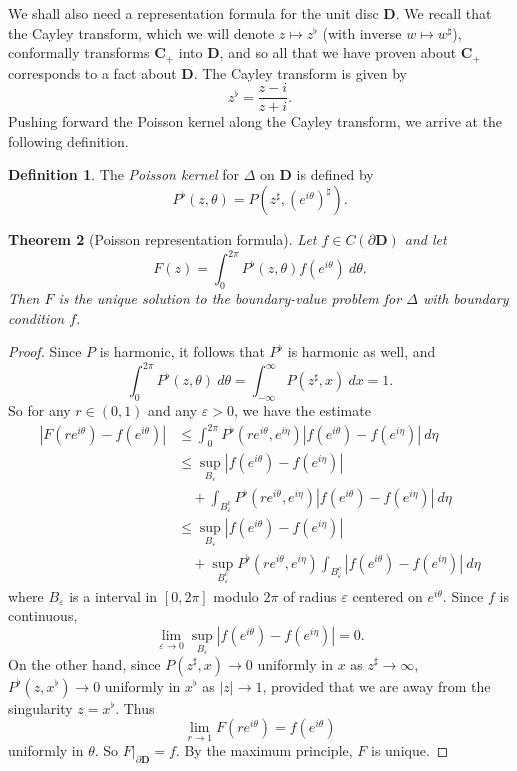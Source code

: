 \documentclass[12pt]{report}
\newcommand{\CC}{\mathbf{C}}
\newcommand{\DD}{\mathbf{D}}
\newcommand{\dfn}[1]{\emph{#1}\index{#1}}
\newtheorem{theorem}{Theorem}[chapter]
\theoremstyle{definition}
\newtheorem{definition}[theorem]{Definition}
\begin{document}
We shall also need a representation formula for the unit disc $\DD$. We recall that the Cayley transform, which we will denote $z \mapsto z^\flat$ (with inverse $w \mapsto w^\sharp$), conformally transforms $\CC_+$ into $\DD$, and so all that we have proven about $\CC_+$ corresponds to a fact about $\DD$. The Cayley transform is given by
$$z^\flat = \frac{z - i}{z + i}.$$
Pushing forward the Poisson kernel along the Cayley transform, we arrive at the following definition.
\begin{definition}
The \dfn{Poisson kernel} for $\Delta$ on $\DD$ is defined by
$$P^\flat(z, \theta) = P(z^\sharp, (e^{i\theta})^\sharp).$$
\end{definition}
\begin{theorem}[Poisson representation formula]
Let $f \in C(\partial \DD)$ and let
$$F(z) = \int_0^{2\pi} P^\flat(z, \theta)f(e^{i\theta}) ~d\theta.$$
Then $F$ is the unique solution to the boundary-value problem for $\Delta$ with boundary condition $f$.
\end{theorem}
\begin{proof}
Since $P$ is harmonic, it follows that $P^\flat$ is harmonic as well, and
$$\int_0^{2\pi} P^\flat(z, \theta) ~d\theta = \int_{-\infty}^\infty P(z^\sharp, x) ~dx = 1.$$
So for any $r \in (0, 1)$ and any $\varepsilon > 0$, we have the estimate
\begin{align*}
  |F(re^{i\theta}) - f(e^{i\theta})| &\leq \int_0^{2\pi} P^\flat(re^{i\theta}, e^{i\eta})|f(e^{i\theta}) - f(e^{i\eta})| ~d\eta\\
    &\leq \sup_{B_\varepsilon} |f(e^{i\theta}) - f(e^{i\eta})| \\
      &\quad+ \int_{B_\varepsilon^c} P^\flat(re^{i\theta}, e^{i\eta})|f(e^{i\theta}) - f(e^{i\eta})| ~d\eta\\
    &\leq \sup_{B_\varepsilon} |f(e^{i\theta}) - f(e^{i\eta})| \\
      &\quad+ \sup_{B_\varepsilon^c} P^\flat(re^{i\theta}, e^{i\eta}) \int_{B_\varepsilon^c} |f(e^{i\theta}) - f(e^{i\eta})| ~d\eta
\end{align*}
where $B_\varepsilon$ is a interval in $[0, 2\pi]$ modulo $2\pi$ of radius $\varepsilon$ centered on $e^{i\theta}$. Since $f$ is continuous,
$$\lim_{\varepsilon \to 0}\sup_{B_\varepsilon} |f(e^{i\theta}) - f(e^{i\eta})| = 0.$$
On the other hand, since $P(z^\sharp, x) \to 0$ uniformly in $x$ as $z^\sharp \to \infty$, $P^\flat(z, x^\flat) \to 0$ uniformly in $x^\flat$ as $|z| \to 1$, provided that we are away from the singularity $z = x^\flat$. Thus
$$\lim_{r \to 1} F(re^{i\theta}) = f(e^{i\theta})$$
uniformly in $\theta$. So $F|_{\partial \DD} = f$. By the maximum principle, $F$ is unique.
\end{proof}
\end{document}
